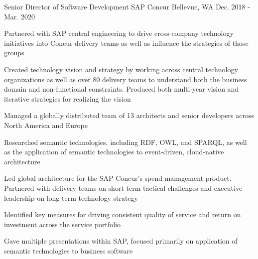\begin{cventries}
\cventry
{Senior Director of Software Development}
{SAP Concur}
{Bellevue, WA}
{Dec. 2018 - Mar. 2020}
{
  \begin{cvitems}
  \item {Partnered with SAP central engineering to drive cross-company technology initiatives into Concur delivery teams as well as influence the strategies of those groups}
  \item {Created technology vision and strategy by working across central technology organizations as well as over 80 delivery teams to understand both the business domain and non-functional constraints. Produced both multi-year vision and iterative strategies for realizing the vision}
  \item {Managed a globally distributed team of 13 architects and senior developers across North America and Europe}
  \item {Researched semantic technologies, including RDF, OWL, and SPARQL, as well as the application of semantic technologies to event-driven, cloud-native architecture}
  \item {Led global architecture for the SAP Concur’s spend management product. Partnered with delivery teams on short term tactical challenges and executive leadership on long term technology strategy}
  \item {Identified key measures for driving consistent quality of service and return on investment across the service portfolio}
  \item {Gave multiple presentations within SAP, focused primarily on application of semantic technologies to business software}
  \end{cvitems}
}



\end{cventries}
